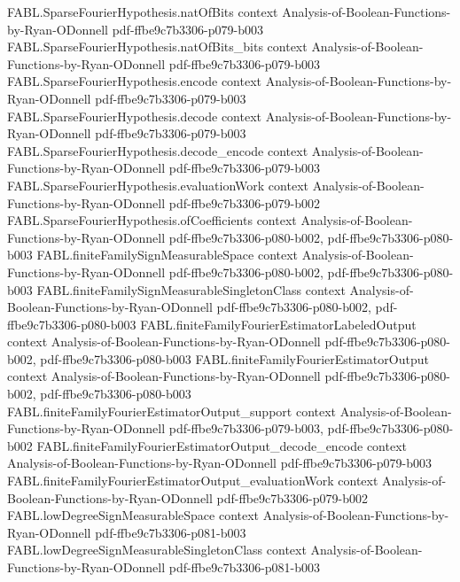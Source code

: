 \begin{theorem}
\proofstep
  {FABL.SparseFourierHypothesis.natOfBits}
  {context}
  {Analysis-of-Boolean-Functions-by-Ryan-ODonnell}
  {pdf-ffbe9c7b3306-p079-b003}
\proofstep
  {FABL.SparseFourierHypothesis.natOfBits_bits}
  {context}
  {Analysis-of-Boolean-Functions-by-Ryan-ODonnell}
  {pdf-ffbe9c7b3306-p079-b003}
\proofstep
  {FABL.SparseFourierHypothesis.encode}
  {context}
  {Analysis-of-Boolean-Functions-by-Ryan-ODonnell}
  {pdf-ffbe9c7b3306-p079-b003}
\proofstep
  {FABL.SparseFourierHypothesis.decode}
  {context}
  {Analysis-of-Boolean-Functions-by-Ryan-ODonnell}
  {pdf-ffbe9c7b3306-p079-b003}
\proofstep
  {FABL.SparseFourierHypothesis.decode_encode}
  {context}
  {Analysis-of-Boolean-Functions-by-Ryan-ODonnell}
  {pdf-ffbe9c7b3306-p079-b003}
\proofstep
  {FABL.SparseFourierHypothesis.evaluationWork}
  {context}
  {Analysis-of-Boolean-Functions-by-Ryan-ODonnell}
  {pdf-ffbe9c7b3306-p079-b002}
\proofstep
  {FABL.SparseFourierHypothesis.ofCoefficients}
  {context}
  {Analysis-of-Boolean-Functions-by-Ryan-ODonnell}
  {pdf-ffbe9c7b3306-p080-b002,
    pdf-ffbe9c7b3306-p080-b003}
\proofstep
  {FABL.finiteFamilySignMeasurableSpace}
  {context}
  {Analysis-of-Boolean-Functions-by-Ryan-ODonnell}
  {pdf-ffbe9c7b3306-p080-b002,
    pdf-ffbe9c7b3306-p080-b003}
\proofstep
  {FABL.finiteFamilySignMeasurableSingletonClass}
  {context}
  {Analysis-of-Boolean-Functions-by-Ryan-ODonnell}
  {pdf-ffbe9c7b3306-p080-b002,
    pdf-ffbe9c7b3306-p080-b003}
\proofstep
  {FABL.finiteFamilyFourierEstimatorLabeledOutput}
  {context}
  {Analysis-of-Boolean-Functions-by-Ryan-ODonnell}
  {pdf-ffbe9c7b3306-p080-b002,
    pdf-ffbe9c7b3306-p080-b003}
\proofstep
  {FABL.finiteFamilyFourierEstimatorOutput}
  {context}
  {Analysis-of-Boolean-Functions-by-Ryan-ODonnell}
  {pdf-ffbe9c7b3306-p080-b002,
    pdf-ffbe9c7b3306-p080-b003}
\proofstep
  {FABL.finiteFamilyFourierEstimatorOutput_support}
  {context}
  {Analysis-of-Boolean-Functions-by-Ryan-ODonnell}
  {pdf-ffbe9c7b3306-p079-b003,
    pdf-ffbe9c7b3306-p080-b002}
\proofstep
  {FABL.finiteFamilyFourierEstimatorOutput_decode_encode}
  {context}
  {Analysis-of-Boolean-Functions-by-Ryan-ODonnell}
  {pdf-ffbe9c7b3306-p079-b003}
\proofstep
  {FABL.finiteFamilyFourierEstimatorOutput_evaluationWork}
  {context}
  {Analysis-of-Boolean-Functions-by-Ryan-ODonnell}
  {pdf-ffbe9c7b3306-p079-b002}
\proofstep
  {FABL.lowDegreeSignMeasurableSpace}
  {context}
  {Analysis-of-Boolean-Functions-by-Ryan-ODonnell}
  {pdf-ffbe9c7b3306-p081-b003}
\proofstep
  {FABL.lowDegreeSignMeasurableSingletonClass}
  {context}
  {Analysis-of-Boolean-Functions-by-Ryan-ODonnell}
  {pdf-ffbe9c7b3306-p081-b003}

\end{theorem}
